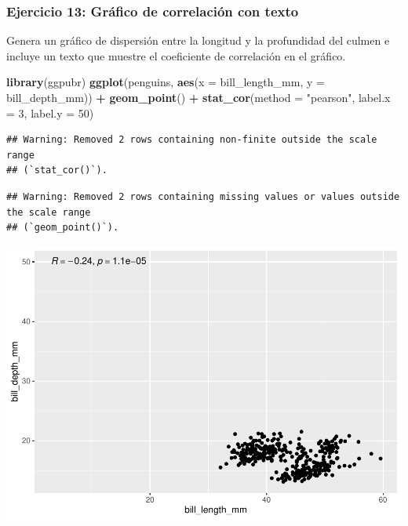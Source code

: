 \documentclass[
]{book}
\newenvironment{Shaded}{\begin{snugshade}}{\end{snugshade}}
\newcommand{\AttributeTok}[1]{\textcolor[rgb]{0.13,0.29,0.53}{#1}}
\newcommand{\DecValTok}[1]{\textcolor[rgb]{0.00,0.00,0.81}{#1}}
\newcommand{\FunctionTok}[1]{\textcolor[rgb]{0.13,0.29,0.53}{\textbf{#1}}}
\newcommand{\NormalTok}[1]{#1}
\newcommand{\SpecialCharTok}[1]{\textcolor[rgb]{0.81,0.36,0.00}{\textbf{#1}}}
\newcommand{\StringTok}[1]{\textcolor[rgb]{0.31,0.60,0.02}{#1}}
\begin{document}
\subsubsection{Ejercicio 13: Gráfico de correlación con texto}\label{ejercicio-13-gruxe1fico-de-correlaciuxf3n-con-texto}

Genera un gráfico de dispersión entre la longitud y la profundidad del culmen e incluye un texto que muestre el coeficiente de correlación en el gráfico.

\begin{Shaded}
\begin{Highlighting}[]
\FunctionTok{library}\NormalTok{(ggpubr)}
\FunctionTok{ggplot}\NormalTok{(penguins, }\FunctionTok{aes}\NormalTok{(}\AttributeTok{x =}\NormalTok{ bill\_length\_mm, }\AttributeTok{y =}\NormalTok{ bill\_depth\_mm)) }\SpecialCharTok{+}
  \FunctionTok{geom\_point}\NormalTok{() }\SpecialCharTok{+}
  \FunctionTok{stat\_cor}\NormalTok{(}\AttributeTok{method =} \StringTok{"pearson"}\NormalTok{, }\AttributeTok{label.x =} \DecValTok{3}\NormalTok{, }\AttributeTok{label.y =} \DecValTok{50}\NormalTok{)}
\end{Highlighting}
\end{Shaded}

\begin{verbatim}
## Warning: Removed 2 rows containing non-finite outside the scale range
## (`stat_cor()`).
\end{verbatim}

\begin{verbatim}
## Warning: Removed 2 rows containing missing values or values outside the scale range
## (`geom_point()`).
\end{verbatim}

\includegraphics{bookdown-demo_files/figure-latex/unnamed-chunk-195-1.pdf}
\end{document}
